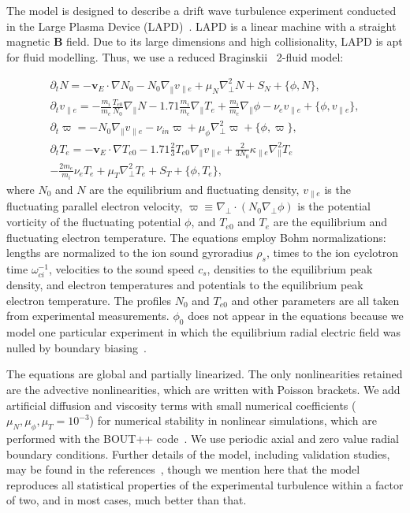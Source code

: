 \documentclass[showpacs,preprintnumbers,amsmath,amssymb,superscriptaddress,aip]{revtex4-1}
\def\beqar{\begin{eqnarray}}
\def\eeqar{\end{eqnarray}}
\newcommand{\pdt}{\partial_t}
\def\grad{\nabla}
\newcommand{\gradpar}{\grad_\parallel}
\newcommand{\gradperp}{\grad_\perp}
\newcommand{\vpe}{v_{\parallel e}}
\newcommand{\nue}{\nu_{e}}
\newcommand{\nuin}{\nu_{in}}
\newcommand{\kpe}{\kappa_{\parallel e}}
\newcommand{\fmie}{\frac{m_i}{m_e}}
\begin{document}
The model is designed to describe a drift wave turbulence experiment conducted in the Large Plasma Device (LAPD)~\cite{gekelman1991}. LAPD is a linear machine with a straight magnetic $\mathbf{B}$ field.
Due to its large dimensions and high collisionality, LAPD is apt for fluid modelling. Thus, we use a reduced Braginskii~\cite{Braginskii1965} 2-fluid model:

\beqar
\label{ni_eq}
\pdt N = - {\mathbf v_E} \cdot \grad N_0 - N_0 \gradpar \vpe + \mu_N \gradperp^2 N + S_N + \{\phi,N\}, \\
\label{ve_eq}
\pdt \vpe = - \fmie \frac{T_{e0}}{N_0} \gradpar N - 1.71 \fmie \gradpar T_e  + \fmie \gradpar \phi - \nue \vpe + \{\phi,\vpe \}, \\
\label{rho_eq}
\pdt \varpi = - N_0 \gradpar \vpe  - \nuin \varpi + \mu_\phi \gradperp^2 \varpi + \{\phi,\varpi \}, \\
\label{te_eq}
\pdt T_e = - {\mathbf v_E} \cdot \grad T_{e0} - 1.71 \frac{2}{3} T_{e0} \gradpar \vpe + \frac{2}{3 N_0} \kpe \gradpar^2 T_e  \nonumber \\
- \frac{2 m_e}{m_i} \nue T_e  + \mu_T \gradperp^2 T_e +  S_T + \{\phi,T_e\},
\eeqar
where $N_0$ and $N$ are the equilibrium and fluctuating density, $\vpe$ is the fluctuating parallel electron velocity, $\varpi \equiv \gradperp \cdot (N_0 \gradperp \phi)$ is the potential vorticity
of the fluctuating potential $\phi$, and $T_{e0}$ and $T_e$ are the equilibrium and fluctuating electron temperature. The equations employ Bohm normalizations: lengths are
normalized to the ion sound gyroradius $\rho_s$, times to the ion cyclotron time $\omega_{ci}^{-1}$, velocities to the sound speed $c_s$, densities to the equilibrium peak density, and electron
temperatures and potentials to the equilibrium peak electron temperature. The profiles $N_0$ and $T_{e0}$ and other parameters are all taken from experimental measurements. $\phi_0$ 
does not appear in the equations because we model one particular experiment in which the equilibrium radial electric field was nulled by boundary biasing~\cite{schaffner2012}. 

The equations are global and partially linearized. The only nonlinearities retained are the advective nonlinearities, which are written with Poisson brackets. 
We add artificial diffusion and viscosity terms with small numerical coefficients ($\mu_N, \mu_\phi, \mu_T = 10^{-3}$)
for numerical stability in nonlinear simulations, which are performed with the BOUT++ code~\cite{dudson2009}. We use periodic axial and zero value radial 
boundary conditions. Further details of the model, including validation studies, may be found in the references~\cite{Popovich2010a,Popovich2010b,Umansky2011,friedman2012b,friedman2013},
though we mention here that the model reproduces all statistical properties of the experimental turbulence within a factor of two, and in most cases, much better than that.
\end{document}
